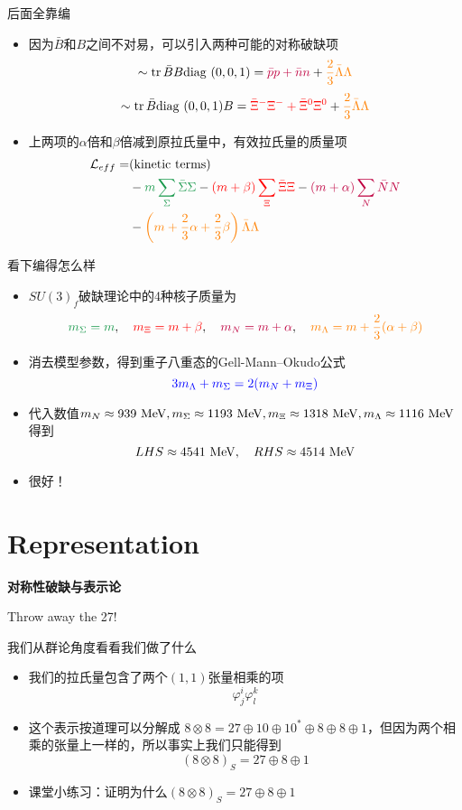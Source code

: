 \documentclass[aspectratio=1610,14pt,mathserif]{beamer}
\newcommand{\bch}{}
\newcommand{\ech}{}
\def\bcenter{\begin{center}}
\def\ecenter{\end{center}}
\def\skipline{{\vskip0.1in}}
\def\tbox#1{\begin{tcolorbox}#1\end{tcolorbox}}
\newcommand{\diag}{\mathrm{diag \ }}
\DeclareMathOperator{\tr}{tr}
\DeclareMathOperator{\diag}{diag}
\newcommand{\lag}{\mathcal{L}}
\def\secpage#1#2{\begin{frame}\bch\bcenter{\bf \Huge #1} \skipline \tbox{#2}\ecenter\ech\end{frame}}
\newcommand{\mev}{\ {\rm MeV}}
\newcommand{\bea}{\begin{equation*}\begin{aligned}}
\newcommand{\eea}{\end{aligned}\end{equation*}}
\newcommand{\red}[1]{{\color{red} #1}}
\def\green#1{{\color[rgb]{0.1,0.6,0.3}#1}}
\newcommand{\purple}[1]{{\color{purple} #1}}
\newcommand{\orange}[1]{{\color{orange} #1}}
\newcommand{\blue}[1]{{\color{blue} #1}}
\begin{document}
\begin{frame}{后面全靠编}
\begin{itemize}
\item 因为$\bar B$和$B$之间不对易，可以引入两种可能的对称破缺项
$$\sim \tr \bar B B \diag(0,0,1) = \purple{\bar p p + \bar n n }+\orange{ \frac{2}{3} \bar \Lambda \Lambda}$$
$$\sim \tr \bar B \diag(0,0,1) B = \red{\bar \Xi^- \Xi^- + \bar \Xi^0 \Xi^0  }+ \orange{ \frac{2}{3} \bar \Lambda \Lambda}$$
\item 上两项的$\alpha$倍和$\beta$倍减到原拉氏量中，有效拉氏量的质量项
\bea
\lag_{eff} = &(\mathrm{kinetic\ terms} )\\  &-\green{m\sum_\Sigma \bar \Sigma \Sigma } - \red{(m+\beta) \sum_\Xi \bar \Xi \Xi} -\purple{(m+\alpha)\sum_N \bar N N} \\ &-\orange{\left(m + \frac{2}{3}\alpha + \frac{2}{3}\beta\right)\bar \Lambda \Lambda}
\eea
\end{itemize}
\end{frame}

\begin{frame}{看下编得怎么样}
\begin{itemize}
\item $SU(3)_f$破缺理论中的4种核子质量为
$$
\green{m_\Sigma = m},\quad \red{m_\Xi = m+\beta},\quad \purple{m_N = m + \alpha} ,\quad \orange{m_\Lambda = m + \frac{2}{3}(\alpha + \beta)}
$$
\item 消去模型参数，得到重子八重态的Gell-Mann--Okudo公式
$$
\blue{3m_\Lambda + m_\Sigma = 2(m_N + m_\Xi)}
$$
\item 代入数值$m_N \approx 939\mev, m_\Sigma \approx 1193\mev, m_\Xi \approx 1318\mev, m_\Lambda \approx 1116\mev$得到
$$
LHS \approx 4541\mev, \quad RHS \approx 4514\mev
$$
\item
很好！
\end{itemize}
\end{frame}

\section{Representation}
\secpage{对称性破缺与表示论}{Throw away the 27!}


\begin{frame}{我们从群论角度看看我们做了什么}
\begin{itemize}
\item
我们的拉氏量包含了两个$(1,1)$张量相乘的项$$\varphi^i_j \varphi^k_l$$
\item
这个表示按道理可以分解成
$8\otimes 8 = 27\oplus 10\oplus 10^* \oplus 8 \oplus 8 \oplus 1$，但因为两个相乘的张量上一样的，所以事实上我们只能得到
$$
(8\otimes 8)_S = 27\oplus 8 \oplus 1
$$
\item
\blue{课堂小练习}：证明为什么$(8\otimes 8)_S = 27\oplus 8 \oplus 1$
\end{itemize}
\end{frame}
\end{document}
